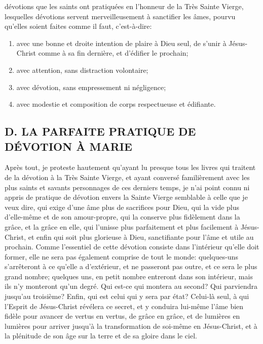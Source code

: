 dévotions que les saints ont pratiquées en l'honneur de la Très Sainte Vierge, lesquelles dévotions servent
merveilleusement à sanctifier les âmes, pourvu qu'elles soient faites comme il faut, c'est-à-dire:
\begin{enumerate}[label=\arabic*°]
  \item avec une bonne et droite intention de plaire à Dieu seul, de s'unir à Jésus-Christ comme à sa fin dernière, et d'édifier le prochain;
  \item avec attention, sans distraction volontaire;
  \item avec dévotion, sans empressement ni négligence;
  \item avec modestie et composition de corps respectueuse et édifiante.
\end{enumerate}

\subsection{D. LA PARFAITE PRATIQUE DE DÉVOTION À MARIE}
 Après tout, je proteste hautement qu'ayant lu presque tous les livres qui traitent de la dévotion à la Très
Sainte Vierge, et ayant conversé familièrement avec les plus saints et savants personnages de ces derniers
temps, je n'ai point connu ni appris de pratique de dévotion envers la Sainte Vierge semblable à celle que je veux
dire, qui exige d'une âme plus de sacrifices pour Dieu, qui la vide plus d'elle-même et de son amour-propre, qui la
conserve plus fidèlement dans la grâce, et la grâce en elle, qui l'unisse plus parfaitement et plus facilement à
Jésus-Christ, et enfin qui soit plus glorieuse à Dieu, sanctifiante pour l'âme et utile au prochain.
 Comme l'essentiel de cette dévotion consiste dans l'intérieur qu'elle doit former, elle ne sera pas également
comprise de tout le monde: quelques-uns s'arrêteront à ce qu'elle a d'extérieur, et ne passeront pas outre, et ce
sera le plus grand nombre; quelques uns, en petit nombre entreront dans son intérieur, mais ils n'y monteront
qu'un degré. Qui est-ce qui montera au second? Qui parviendra jusqu'au troisième? Enfin, qui est celui qui y sera
par état? Celui-là seul, à qui l'Esprit de Jésus-Christ révélera ce secret, et y conduira lui-même l'âme bien fidèle
pour avancer de vertus en vertus, de grâce en grâce, et de lumières en lumières pour arriver jusqu'à la
transformation de soi-même en Jésus-Christ, et à la plénitude de son âge sur la terre et de sa gloire dans le ciel.


